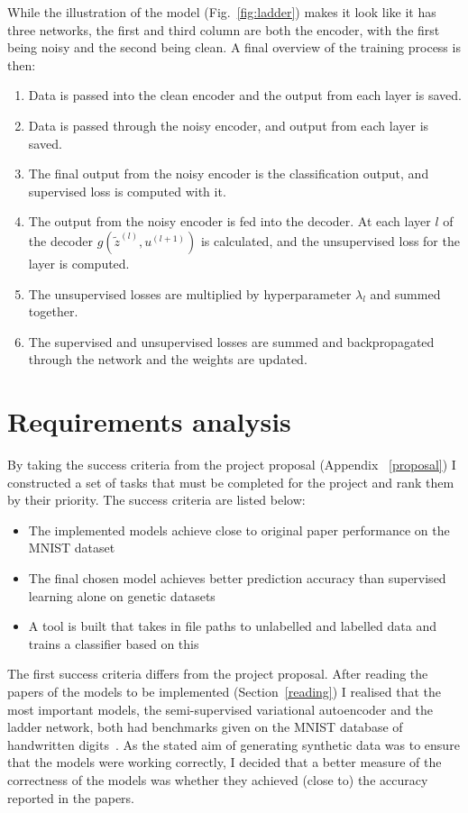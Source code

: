 \documentclass[12pt,a4paper,twoside,openright]{report}
\begin{document}
While the illustration of the model (Fig.~\ref{fig:ladder}) makes it look like it has three networks, the first and third column are both the encoder, with the first being 
noisy and the second being clean. A final overview of the training process is then:
\begin{enumerate}
  \item Data is passed into the clean encoder and the output from each layer is saved.
  \item Data is passed through the noisy encoder, and output from each layer is saved.
  \item The final output from the noisy encoder is the classification output, and supervised loss is computed with it.
  \item The output from the noisy encoder is fed into the decoder. At each layer $l$ of the decoder $g(\tilde{z}^{(l)}, u^{(l+1)})$ is calculated,
        and the unsupervised loss for the layer is computed.
  \item The unsupervised losses are multiplied by hyperparameter $\lambda_{l}$ and summed together.
  \item The supervised and unsupervised losses are summed and backpropagated through the network and the weights are updated.
\end{enumerate}  

\section{Requirements analysis}

By taking the success criteria from the project proposal (Appendix ~\ref{proposal}) I constructed a set of tasks that must be completed for the 
project and rank them by their priority. The success criteria are listed below:

\begin{itemize}
  \item The implemented models achieve close to original paper performance on the MNIST dataset 
  \item The final chosen model achieves better prediction accuracy than supervised learning alone on genetic datasets
  \item A tool is built that takes in file paths to unlabelled and labelled data and trains a classifier based on this
\end{itemize}

The first success criteria differs from the project proposal. After reading the papers of the models to be implemented (Section~\ref{reading}) I 
realised that the most important models, the semi-supervised variational autoencoder and the ladder network, both had benchmarks given on 
the MNIST database of handwritten digits~\cite{lecun-mnisthandwrittendigit-2010}. As the stated aim of generating synthetic data was to
ensure that the models were working correctly, I decided that a better measure of the correctness of the models was whether they
achieved (close to) the accuracy reported in the papers.
\end{document}
